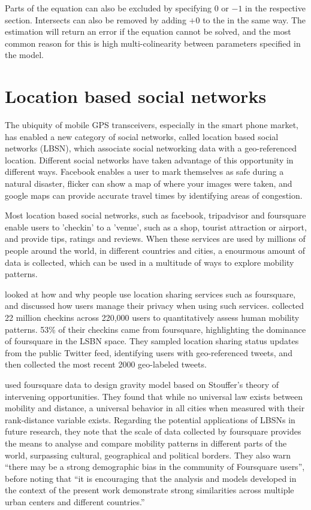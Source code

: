 Parts of the equation can also be excluded by specifying $0$ or $-1$ in the respective section. Intersects can also be removed by adding $+ 0$ to the in the same way. The estimation will return an error if the equation cannot be solved, and the most common reason for this is high multi-colinearity between parameters specified in the model.

\section{Location based social networks}
The ubiquity of mobile GPS transceivers, especially in the smart phone market, has enabled a new category of social networks, called location based social networks (LBSN), which associate social networking data with a geo-referenced location. Different social networks have taken advantage of this opportunity in different ways. Facebook enables a user to mark themselves as safe during a natural disaster, flicker can show a map of where your images were taken, and google maps can provide accurate travel times by identifying areas of congestion. 

Most location based social networks, such as facebook, tripadvisor and foursquare enable users to 'checkin' to a 'venue', such as a shop, tourist attraction or airport, and provide tips, ratings and reviews. When these services are used by millions of people around the world, in different countries and cities, a enourmous amount of data is collected, which can be used in a multitude of ways to explore mobility patterns. 

\textcite{lindqvist2011m} looked at how and why people use location sharing services such as foursquare, and discussed how users manage their privacy when using such services. \autocite{cheng2011exploring} collected 22 million checkins across 220,000 users to quantitatively assess human mobility patterns. 53\% of their checkins came from foursquare, highlighting the dominance of foursquare in the LSBN space. They sampled location sharing status updates from the public Twitter feed, identifying users with geo-referenced tweets, and then collected the most recent 2000 geo-labeled tweets.

\textcite{noulas2012tale} used foursquare data to design gravity model based on Stouffer's theory of intervening opportunities. They found that while no universal law exists between mobility and distance, a universal behavior in all cities when measured with their rank-distance variable exists. Regarding the potential applications of LBSNs in future research, they note that the scale of data collected by foursquare provides the means to analyse and compare mobility patterns in different parts of the world, surpassing cultural, geographical and political borders. They also warn \enquote{there may be a strong demographic bias in the community of Foursquare users}, before noting that \enquote{it is encouraging that the analysis and models developed in the context of the present work demonstrate strong similarities across multiple urban centers and different countries.}

